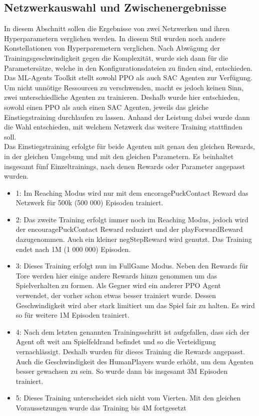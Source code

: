 \subsection{Netzwerkauswahl und Zwischenergebnisse}
\label{subsect:netzwahl_ergs}

In diesem Abschnitt sollen die Ergebnisse von zwei Netzwerken und ihren Hyperparametern verglichen werden. In diesem Stil wurden noch andere Konstellationen von Hyperparemetern verglichen. Nach Abwägung der Trainingsgeschwindigkeit gegen die Komplexität, wurde sich dann für die Parametersätze, welche in den Konfigurationsdateien zu finden sind, entschieden. \\
Das ML-Agents Toolkit stellt sowohl PPO als auch SAC Agenten zur Verfügung. Um nicht unnötige Ressourcen zu verschwenden, macht es jedoch keinen Sinn, zwei unterschiedliche Agenten zu trainieren. Deshalb wurde hier entschieden, sowohl einen PPO als auch einen SAC Agenten, jeweils das gleiche Einstiegstraining durchlaufen zu lassen. Anhand der Leistung dabei wurde dann die Wahl entschieden, mit welchem Netzwerk das weitere Training stattfinden soll. \\

Das Einstiegstraining erfolgte für beide Agenten mit genau den gleichen Rewards, in der gleichen Umgebung und mit den gleichen Parametern. Es beinhaltet insgesamt fünf Einzeltrainings, nach denen Rewards oder Parameter angepasst wurden. 

\begin{itemize}
\item 1: Im Reaching Modus wird nur mit dem encoragePuckContact Reward das Netzwerk für 500k (500 000) Episoden trainiert. 

\item 2: Das zweite Training erfolgt immer noch im Reaching Modus, jedoch wird der encouragePuckContact Reward reduziert und der playForwardReward dazugenommen. Auch ein kleiner negStepReward wird genutzt. Das Training endet nach 1M (1 000 000) Episoden.

\item 3: Dieses Training erfolgt nun im FullGame Modus. Neben den Rewards für Tore werden hier einige andere Rewards hinzu genommen um das Spielverhalten zu formen. Als Gegner wird ein anderer PPO Agent verwendet, der vorher schon etwas besser trainiert wurde. Dessen Geschwindigkeit wird aber stark limitiert um das Spiel fair zu halten. Es wird so für weitere 1M Episoden trainiert.

\item 4: Nach dem letzten genannten Trainingsschritt ist aufgefallen, dass sich der Agent oft weit am Spielfeldrand befindet und so die Verteidigung vernachlässigt. Deshalb wurden für dieses Training die Rewards angepasst. Auch die Geschwindigkeit des HumanPlayers wurde erhöht, um dem Agenten besser gewachsen zu sein. So wurde dann bis insgesamt 3M Episoden trainiert.

\item 5: Dieses Training unterscheidet sich nicht vom Vierten. Mit den gleichen Voraussetzungen wurde das Training bis 4M fortgesetzt
\end{itemize}

